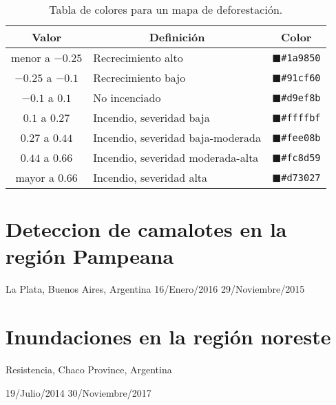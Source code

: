 \begin{enumerate}
\begin{table}[]
\centering
\begin{tabular}{@{}cll@{}}
\toprule
Valor              & \multicolumn{1}{c}{Definición}       & \multicolumn{1}{c}{Color}                        \\ \midrule
menor a $-0.25$    & Recrecimiento alto                   & \textcolor{NB1}{$\blacksquare$}\texttt{\#1a9850} \\
$-0.25$ a $-0.1$   & Recrecimiento bajo   		  & \textcolor{NB2}{$\blacksquare$}\texttt{\#91cf60} \\
$-0.1$ a $0.1$     & No incenciado     		 	  & \textcolor{NB3}{$\blacksquare$}\texttt{\#d9ef8b} \\
$0.1$ a $0.27$     & Incendio, severidad baja		  & \textcolor{NB4}{$\blacksquare$}\texttt{\#ffffbf} \\
$0.27$ a $0.44$    & Incendio, severidad baja-moderada    & \textcolor{NB5}{$\blacksquare$}\texttt{\#fee08b} \\
$0.44$ a $0.66$    & Incendio, severidad moderada-alta    & \textcolor{NB6}{$\blacksquare$}\texttt{\#fc8d59} \\
mayor a $0.66$     & Incendio, severidad alta             & \textcolor{NB7}{$\blacksquare$}\texttt{\#d73027} \\ \bottomrule
\end{tabular} 
\caption{Tabla de colores para un mapa de deforestación.}
\label{tab:inc}
\end{table}
\end{enumerate}
\section{Deteccion de camalotes en la región Pampeana}

La Plata, Buenos Aires, Argentina
16/Enero/2016
29/Noviembre/2015

\section{Inundaciones en la región noreste}

Resistencia, Chaco Province, Argentina

19/Julio/2014
30/Noviembre/2017
